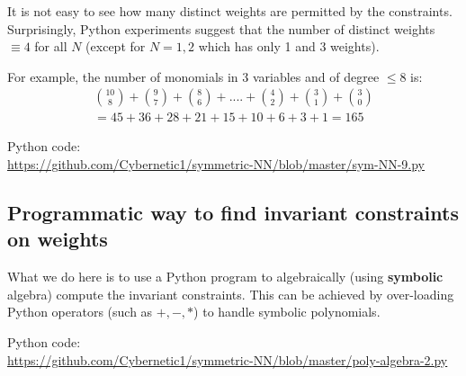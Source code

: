 It is not easy to see how many distinct weights are permitted by the constraints.  Surprisingly, Python experiments suggest that the number of distinct weights $\equiv 4$ for all $N$ (except for $N = 1, 2$ which has only 1 and 3 weights).

For example, the number of monomials in 3 variables and of degree $\le 8$ is:
\begin{eqnarray}
{10\choose8} + {9\choose7} + {8\choose6} + .... + {4\choose2} + {3\choose1} + {3\choose0} \nonumber \\
= 45 + 36 + 28 + 21 + 15 + 10 + 6 + 3 + 1 = 165
\end{eqnarray}

Python code: \\
\href{https://github.com/Cybernetic1/symmetric-NN/blob/master/sym-NN-9.py}{https://github.com/Cybernetic1/symmetric-NN/blob/master/sym-NN-9.py}

\subsection{Programmatic way to find invariant constraints on weights}

What we do here is to use a Python program to algebraically (using \textbf{symbolic} algebra) compute the invariant constraints.  This can be achieved by over-loading Python operators (such as $+, -, *$) to handle symbolic polynomials.

Python code: \\
\href{https://github.com/Cybernetic1/symmetric-NN/blob/master/poly-algebra-2.py}{https://github.com/Cybernetic1/symmetric-NN/blob/master/poly-algebra-2.py}


